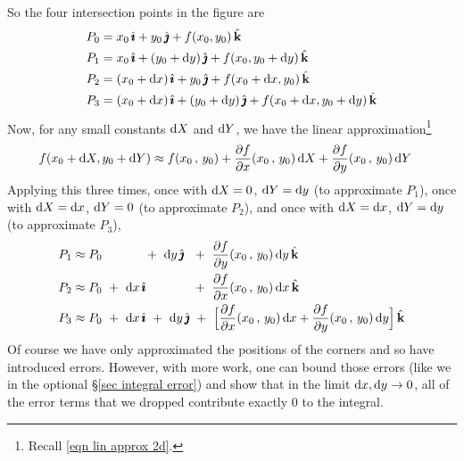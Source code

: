 So the four intersection points in the figure are
\begin{alignat*}{3}
P_0&=x_0\,\hat{\pmb{\imath}}+y_0\,\hat{\pmb{\jmath}} + f(x_0,y_0)\,\hat{\mathbf{k}} \\
   P_1&=x_0\,\hat{\pmb{\imath}}+(y_0+\mathrm{d}y)\,\hat{\pmb{\jmath}} + f(x_0,y_0+\mathrm{d}y)\,\hat{\mathbf{k}} \\
P_2&=(x_0+\mathrm{d}x)\,\hat{\pmb{\imath}}+y_0\,\hat{\pmb{\jmath}} + f(x_0+\mathrm{d}x,y_0)\,\hat{\mathbf{k}} \\
   P_3&=(x_0+\mathrm{d}x)\,\hat{\pmb{\imath}}+(y_0+\mathrm{d}y)\,\hat{\pmb{\jmath}} + f(x_0+\mathrm{d}x,y_0+\mathrm{d}y)\,\hat{\mathbf{k}} 
\end{alignat*}
Now, for any small constants $\mathrm{d}X$ and $\mathrm{d}Y$, we have the linear
approximation\footnote{Recall \eqref{eqn lin approx 2d}.}
\begin{align*}
f(x_0+\dee{X},y_0+\dee{Y})
&\approx f(x_0\,,\,y_0)
   +\pdiff{f}{x}(x_0\,,\,y_0)\,\dee{X}
   +\pdiff{f}{y}(x_0\,,\,y_0)\,\dee{Y}
\end{align*}
Applying this three times, 
once with $\mathrm{d}X=0$, $\mathrm{d}Y=\mathrm{d}y$ (to approximate $P_1$),
once with $\mathrm{d}X=\mathrm{d}x$, $\mathrm{d}Y=0$ (to approximate $P_2$), 
and once with  $\mathrm{d}X=\mathrm{d}x$, $\mathrm{d}Y=\mathrm{d}y$ (to approximate $P_3$),
\begin{alignat*}{3}
P_1&\approx P_0 \phantom{\ +\ \dee{x}\,\hi}
   \ +\ \dee{y}\,\hj\ \ +\   \pdiff{f}{y}(x_0\,,\,y_0)\,\dee{y}\,\hk\\
P_2&\approx P_0
   \ +\ \dee{x}\,\hi  \phantom{\ +\  \dee{y}\,\hj} 
   \ \ +\  \pdiff{f}{x}(x_0\,,\,y_0)\,\dee{x}\,\hk\\
P_3&\approx P_0
   \ +\ \dee{x}\,\hi\ +\ \dee{y}\,\hj \ +\  
           \Big[ \pdiff{f}{x}(x_0\,,\,y_0)\,\dee{x}
                               +  \pdiff{f}{y}(x_0\,,\,y_0)\,\dee{y}\Big]\,\hk
\end{alignat*}
Of course we have only approximated the positions of the corners and
so have introduced errors. However, with more work, one can bound 
those errors (like we in the optional \S\ref{sec integral error})
and show that in the limit $\mathrm{d}x,\mathrm{d}y\rightarrow 0$, all of the 
error terms that we dropped contribute exactly $0$ to the integral.

